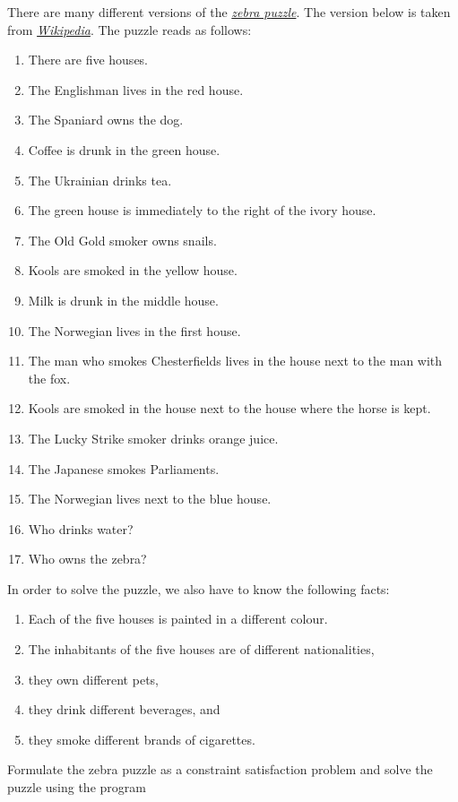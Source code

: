 \exercise
There are many different versions of the \href{https://en.wikipedia.org/wiki/Zebra_Puzzle}{\emph{zebra puzzle}}.  
The version below is taken from \href{https://en.wikipedia.org/wiki/Zebra_Puzzle}{\emph{Wikipedia}}.  The
puzzle reads as follows:
\begin{enumerate}
\item There are five houses.
\item The Englishman lives in the red house.
\item The Spaniard owns the dog.
\item Coffee is drunk in the green house.
\item The Ukrainian drinks tea.
\item The green house is immediately to the right of the ivory house.
\item The Old Gold smoker owns snails.
\item Kools are smoked in the yellow house.
\item Milk is drunk in the middle house.
\item The Norwegian lives in the first house.
\item The man who smokes Chesterfields lives in the house next to the man with the fox.
\item Kools are smoked in the house next to the house where the horse is kept.
\item The Lucky Strike smoker drinks orange juice.
\item The Japanese smokes Parliaments.
\item The Norwegian lives next to the blue house.
\item Who drinks water? 
\item Who owns the zebra?
\end{enumerate}
In order to solve the puzzle, we also have to know the following facts:
\begin{enumerate}
\item Each of the five houses is painted in a {\color{blue}different} colour.
\item The inhabitants of the five houses are of {\color{blue}different} nationalities,
\item they own {\color{blue}different} pets, 
\item they drink {\color{blue}different} beverages, and 
\item they smoke {\color{blue}different} brands of cigarettes. 
\end{enumerate}
Formulate the zebra puzzle as a constraint satisfaction problem and solve the puzzle using the program
